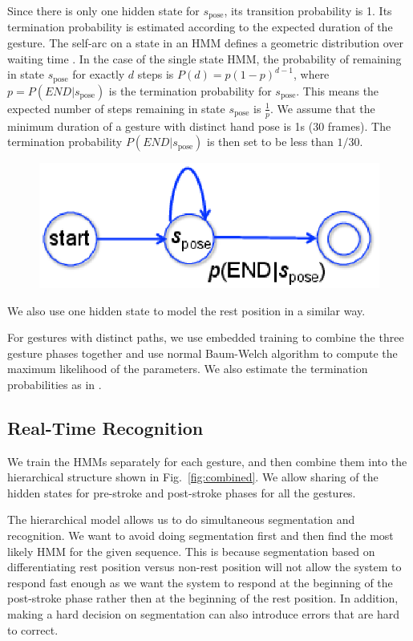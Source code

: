 \documentclass[conference]{IEEEtran}
\begin{document}
Since there is only one hidden state for $s_{\text{pose}}$, its transition
probability is 1. Its termination probability is estimated according to the
expected duration of the gesture. The self-arc on a state in an HMM defines a 
geometric distribution over waiting time \cite{murphy02}. In the case of the
single state HMM, the probability of remaining in state $s_{\text{pose}}$ for
exactly $d$ steps is $P(d) = p(1-p)^{d - 1}$, where $p = P(END|s_\text{pose})$
is the termination probability for $s_{\text{pose}}$. This means the expected
number of steps remaining in state $s_{\text{pose}}$ is $\frac{1}{p}$. We assume
that the minimum duration of a gesture with distinct hand pose is 1s (30
frames). The termination probability $P(END|s_\text{pose})$ is then set to
be less than $1/30$.

\begin{figure}[t]
\centering
\includegraphics[width=\columnwidth]{fig/single_state.ps}
\end{figure}

We also use one hidden state to model the rest position in a similar way.

For gestures with distinct paths, we use embedded training to combine the three
gesture phases together and use normal Baum-Welch algorithm to compute the
maximum likelihood of the parameters. We also estimate the termination
probabilities as in \cite{yin13}.


\subsection{Real-Time Recognition}
We train the HMMs separately for each gesture, and then combine them into the
hierarchical structure shown in Fig.~\ref{fig:combined}. We allow sharing of the
hidden states for pre-stroke and post-stroke phases for all the gestures.

The hierarchical model allows us to do simultaneous segmentation and
recognition. We want to avoid doing segmentation first and then find the most
likely HMM for the given sequence. This is because segmentation based on
differentiating rest position versus non-rest position will not allow the system
to respond fast enough as we want the system to respond at the beginning of the
post-stroke phase rather then at the beginning of the rest position. In
addition, making a hard decision on segmentation can also introduce errors that
are hard to correct. 
\end{document}

